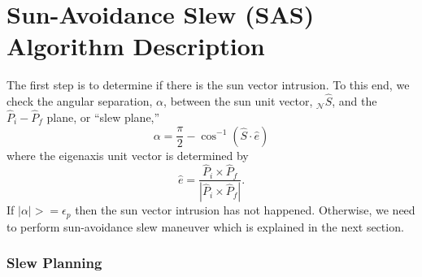 \documentclass[letterpaper, paper,12pt]{AAS}		%
\begin{document}
\section{Sun-Avoidance Slew (SAS) Algorithm Description} 
	The first step is to determine if there is the sun vector intrusion. To this end, we check the angular separation, $\alpha$, between the sun unit vector, $_\mathcal{N}\hat{S}$, and the $\hat{P}_i-\hat{P}_f$ plane, or ``slew plane,''
		\begin{equation}
		\alpha=\frac{\pi}{2}-\cos^{-1}(\hat{S}\cdot\hat{e})
		\end{equation}
		where the eigenaxis unit vector is determined by
		\begin{equation}\label{eaxis}
		\hat{e}=\frac{\hat{P}_i\times\hat{P}_f}{|\hat{P}_i\times \hat{P}_f|}.
		\end{equation} 
If $|\alpha|>=\epsilon_p$ then the sun vector intrusion has not happened. Otherwise, we need to perform sun-avoidance slew maneuver which is explained in the next section.
	
	
	
	\subsubsection{Slew Planning}
\end{document}
